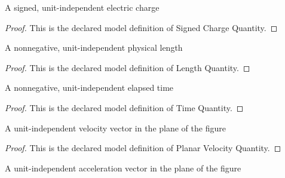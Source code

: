\begin{definition}
  \label{def:physics:phyx-mini-0909:phyxminiproblems-problemphyxmini0909-signedchargequantity}
  A signed, unit-independent electric charge
\end{definition}
\begin{proof}
  This is the declared model definition of Signed Charge Quantity.
\end{proof}
\begin{definition}
  \label{def:physics:phyx-mini-0909:phyxminiproblems-problemphyxmini0909-lengthquantity}
  A nonnegative, unit-independent physical length
\end{definition}
\begin{proof}
  This is the declared model definition of Length Quantity.
\end{proof}
\begin{definition}
  \label{def:physics:phyx-mini-0909:phyxminiproblems-problemphyxmini0909-timequantity}
  A nonnegative, unit-independent elapsed time
\end{definition}
\begin{proof}
  This is the declared model definition of Time Quantity.
\end{proof}
\begin{definition}
  \label{def:physics:phyx-mini-0909:phyxminiproblems-problemphyxmini0909-planarvelocityquantity}
  A unit-independent velocity vector in the plane of the figure
\end{definition}
\begin{proof}
  This is the declared model definition of Planar Velocity Quantity.
\end{proof}
\begin{definition}
  \label{def:physics:phyx-mini-0909:phyxminiproblems-problemphyxmini0909-planaraccelerationquantity}
  A unit-independent acceleration vector in the plane of the figure
\end{definition}

